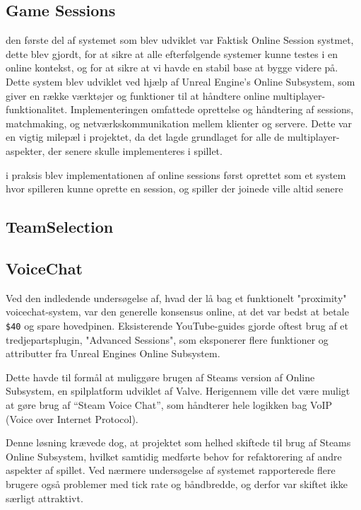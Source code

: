 \subsection{Game Sessions}
den første del af systemet som blev udviklet var Faktisk Online Session systmet, dette blev gjordt, for at sikre at alle efterfølgende systemer kunne testes i en online kontekst, og for at sikre at vi havde en stabil base at bygge videre på. Dette system blev udviklet ved hjælp af Unreal Engine's Online Subsystem, som giver en række værktøjer og funktioner til at håndtere online multiplayer-funktionalitet. Implementeringen omfattede oprettelse og håndtering af sessions, matchmaking, og netværkskommunikation mellem klienter og servere. Dette var en vigtig milepæl i projektet, da det lagde grundlaget for alle de multiplayer-aspekter, der senere skulle implementeres i spillet.

i praksis blev implementationen af online sessions først oprettet som et system hvor spilleren kunne oprette en session, og spiller der joinede ville altid senere 

\newpage
\subsection{TeamSelection}


\newpage
\subsection{VoiceChat}
Ved den indledende undersøgelse af, hvad der lå bag et funktionelt "proximity" voicechat-system, var den generelle konsensus online, at det var bedst at betale \texttt{\$40} og spare hovedpinen. Eksisterende YouTube-guides gjorde oftest brug af et tredjepartsplugin, "Advanced Sessions", som eksponerer flere funktioner og attributter fra Unreal Engines Online Subsystem.

Dette havde til formål at muliggøre brugen af Steams version af Online Subsystem, en spilplatform udviklet af Valve. Herigennem ville det være muligt at gøre brug af “Steam Voice Chat”, som håndterer hele logikken bag VoIP (Voice over Internet Protocol).

Denne løsning krævede dog, at projektet som helhed skiftede til brug af Steams Online Subsystem, hvilket samtidig medførte behov for refaktorering af andre aspekter af spillet. Ved nærmere undersøgelse af systemet rapporterede flere brugere også problemer med tick rate og båndbredde, og derfor var skiftet ikke særligt attraktivt.


